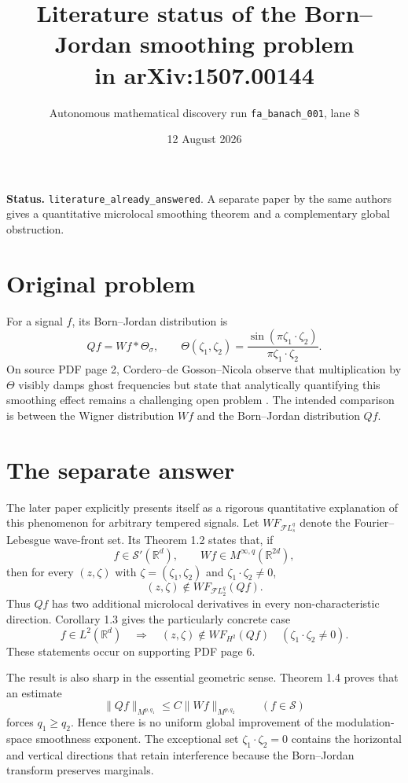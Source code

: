 \documentclass[11pt]{article}
\title{Literature status of the Born--Jordan smoothing problem\\in arXiv:1507.00144}
\author{Autonomous mathematical discovery run \texttt{fa\_banach\_001}, lane 8}
\date{12 August 2026}
\begin{document}
\maketitle

\noindent\textbf{Status.}
\texttt{literature\_already\_answered}.  A separate paper by the same
authors gives a quantitative microlocal smoothing theorem and a complementary
global obstruction.

\section*{Original problem}
For a signal $f$, its Born--Jordan distribution is
\[
  Qf=Wf*\Theta_\sigma,
  \qquad
  \Theta(\zeta_1,\zeta_2)
   =\frac{\sin(\pi\zeta_1\cdot\zeta_2)}
          {\pi\zeta_1\cdot\zeta_2}.
\]
On source PDF page 2, Cordero--de Gosson--Nicola observe that multiplication
by $\Theta$ visibly damps ghost frequencies but state that analytically
quantifying this smoothing effect remains a challenging open problem
\cite{CGN15}.  The intended comparison is between the Wigner distribution
$Wf$ and the Born--Jordan distribution $Qf$.

\section*{The separate answer}
The later paper \cite{CGN16} explicitly presents itself as a rigorous
quantitative explanation of this phenomenon for arbitrary tempered signals.
Let $WF_{\mathcal{F}L_s^q}$ denote the Fourier--Lebesgue wave-front set.  Its
Theorem 1.2 states that, if
\[
  f\in\mathcal S'(\mathbb R^d),\qquad
  Wf\in M^{\infty,q}(\mathbb R^{2d}),
\]
then for every $(z,\zeta)$ with
$\zeta=(\zeta_1,\zeta_2)$ and
$\zeta_1\cdot\zeta_2\ne0$,
\[
  (z,\zeta)\notin WF_{\mathcal{F}L_2^q}(Qf).
\]
Thus $Qf$ has two additional microlocal derivatives in every
non-characteristic direction.  Corollary 1.3 gives the particularly concrete
case
\[
  f\in L^2(\mathbb R^d)
  \quad\Longrightarrow\quad
  (z,\zeta)\notin WF_{H^2}(Qf)
  \quad(\zeta_1\cdot\zeta_2\ne0).
\]
These statements occur on supporting PDF page 6.

The result is also sharp in the essential geometric sense.  Theorem 1.4
proves that an estimate
\[
  \|Qf\|_{M^{p,q_1}}\le C\|Wf\|_{M^{p,q_2}}
  \qquad(f\in\mathcal S)
\]
forces $q_1\ge q_2$.  Hence there is no uniform global improvement of the
modulation-space smoothness exponent.  The exceptional set
$\zeta_1\cdot\zeta_2=0$ contains the horizontal and vertical directions that
retain interference because the Born--Jordan transform preserves marginals.
\end{document}
